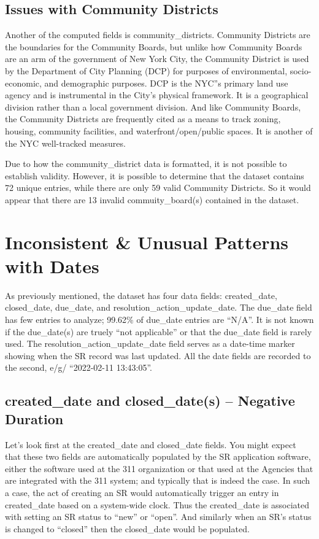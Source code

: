 \documentclass[12pt, titlepage]{article}
\begin{document}
	\subsection{Issues with Community Districts}
	Another of the computed fields is community\_districts. Community Districts are the boundaries for the Community Boards, but unlike how Community Boards are
	an arm of the government of New York City, the Community District is used by the Department of City Planning (DCP) for purposes of environmental, socio-economic, and
	demographic purposes. DCP is the NYC''s primary land use agency and is instrumental in the City's physical framework.  It is a geographical division rather
	than a local government division. And like Community Boards, the Community Districts are frequently cited as a means to track zoning, housing, community facilities,
	and waterfront/open/public spaces. It is another of the NYC well-tracked measures.

	Due to how the community\_district data is formatted, it is not possible to establish validity. However, it is possible to determine that the dataset contains
	72 unique entries, while there are only 59 valid Community Districts. So it would appear that there are 13 invalid commuity\_board(s) contained in the dataset.
	
	
	
\section{Inconsistent \& Unusual Patterns with Dates}\label{sec:inconsistencies}

As previously mentioned, the dataset has four data fields:  created\_date, closed\_date, due\_date, and resolution\_action\_update\_date.
The due\_date field has few entries to analyze; 99.62\% of due\_date entries are ``N/A''.  It is not known if the due\_date(s) are truely
``not applicable'' or that the due\_date field is rarely used. The  resolution\_action\_update\_date field serves as a date-time marker
showing when the SR record was last updated.  All the date fields are recorded to the second, e/g/ ``2022-02-11 13:43:05''.

\subsection{created\_date and closed\_date(s) -- Negative Duration}
Let's look first at the created\_date and closed\_date fields. You might expect that these two fields are automatically populated by the 
SR application software, either the software used at the 311 organization or that used at the Agencies that are integrated with the 311 system;
and typically that is indeed the case. In such a case, the act of creating an SR would automatically trigger an entry in created\_date based on a system-wide clock. Thus
the created\_date is associated with setting an SR status to ``new'' or ``open''. And similarly when an SR's status is changed to
``closed'' then the closed\_date would be populated. 
\end{document}
